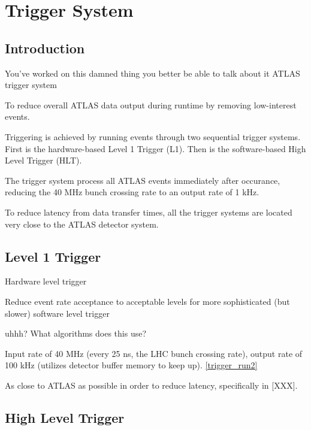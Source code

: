 \chapter{Trigger System} %
\section{Introduction}
You've worked on this damned thing you better be able to talk about it
ATLAS trigger system

To reduce overall ATLAS data output during runtime by removing low-interest events.

Triggering is achieved by running events through two sequential trigger systems.
First is the hardware-based Level 1 Trigger (L1).
Then is the software-based High Level Trigger (HLT).

The trigger system process all ATLAS events immediately after occurance, reducing the 40 MHz bunch crossing rate to an output rate of 1 kHz.

To reduce latency from data transfer times, all the trigger systems are located very close to the ATLAS detector system.



\section{Level 1 Trigger}

Hardware level trigger

Reduce event rate acceptance to acceptable levels for more sophisticated (but slower) software level trigger

uhhh? What algorithms does this use?

Input rate of 40 MHz (every 25 ns, the LHC bunch crossing rate), output rate of 100 kHz (utilizes detector buffer memory to keep up). \ref{trigger_run2}

As close to ATLAS as possible in order to reduce latency, specifically in [XXX].



\section{High Level Trigger}

